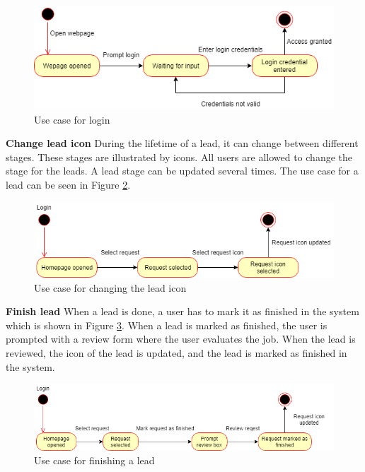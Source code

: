\begin{figure}[H]
    \centering
    \includegraphics[scale=0.6, clip]{figures/useCaseLogin.png}
    \caption{Use case for login }
    \label{fig:useCaseLogin}
\end{figure}
\noindent
\textbf{Change lead icon}\newline
During the lifetime of a lead, it can change between different stages. These stages are illustrated by icons. All users are allowed to change the stage for the leads. A lead stage can be updated several times. The use case for a lead can be seen in Figure \ref{fig:useCaseChangeRequestIcon}.
\begin{figure}[H]
    \centering
    \includegraphics[scale=0.6, clip]{figures/useCaseChangeRequestIcon.png}
    \caption{Use case for changing the lead icon}
    \label{fig:useCaseChangeRequestIcon}
\end{figure}
\noindent
\textbf{Finish lead}\newline
When a lead is done, a user has to mark it as finished in the system which is shown in Figure \ref{fig:useCaseFinishRequest}. When a lead is marked as finished, the user is prompted with a review form where the user evaluates the job. When the lead is reviewed, the icon of the lead is updated, and the lead is marked as finished in the system.
\begin{figure}[H]
    \centering
    \includegraphics[scale=0.6, clip]{figures/useCaseFinishRequest.png}
    \caption{Use case for finishing a lead}
    \label{fig:useCaseFinishRequest}
\end{figure}
